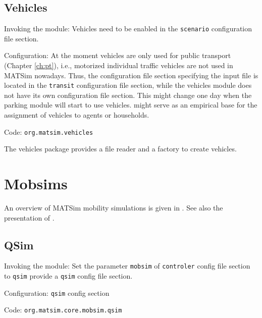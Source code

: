 \subsection{Vehicles}
\label{sec:vehicles}
\begin{compactitem}
\item Invoking the module: Vehicles need to be enabled in the \lstinline|scenario| configuration file section.
\item Configuration: At the moment vehicles are only used for public transport (Chapter \ref{ch:pt}), i.e., motorized individual traffic vehicles are not used in MATSim nowadays. Thus, the configuration file section specifying the input file is located in the \lstinline|transit| configuration file section, while the vehicles module does not have its own configuration file section.  This might change one day when the parking module will start to use vehicles. \citet[][]{JaeggiEtAl_TRR_2012} might serve as an empirical base for the assignment of vehicles to agents or households.
\item Code: \lstinline|org.matsim.vehicles|
\end{compactitem}

The vehicles package provides a file reader and a factory to create vehicles.



\section{Mobsims}
\label{sec:mobsims}
An overview of MATSim mobility simulations is given in \citet[][]{Dobler_TechRep_IVT_2011}. See also the presentation of \citet[][]{Rieser_unpub_IVT_2011}.

\subsection{QSim}
\label{sec:qsim}
\begin{compactitem}
\item Invoking the module: Set the parameter \lstinline|mobsim| of \lstinline|controler| config file section to \lstinline|qsim| provide a \lstinline|qsim| config file section.
\item Configuration: \lstinline|qsim| config section
\item Code: \lstinline|org.matsim.core.mobsim.qsim|
\end{compactitem}

